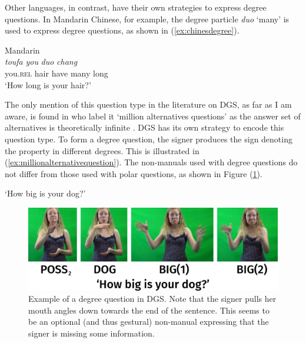 \noindent Other languages, in contrast, have their own strategies to express degree questions. In Mandarin Chinese, for example, the degree particle \textit{duo} `many' is used to express degree questions, as shown in (\ref{ex:chinesdegree}).


\begin{exe}
\ex Mandarin \\  {\textit{toufa}} {\textit{you}} {\textit{duo}} {\textit{chang}} \\
{you.\textsc{rel}} {hair} {have} {many} {long} \\
\trans `How long is your hair?' \label{ex:chinesdegree}
\end{exe} 

\noindent The only mention of this question type in the literature on DGS, as far as I am aware, is found in \citet[335]{happ2014vork} who label it `million alternatives questions' as the answer set of alternatives is theoretically infinite \citep{fox2006universal}. DGS has its own strategy to encode this question type. To form a degree question, the signer produces the sign denoting the property in different degrees. This is illustrated in (\ref{ex:millionalternativequestion}). The non-manuals used with degree questions do not differ from those used with polar questions, as shown in Figure (\ref{millionalternativequestions}).

\begin{exe}
\ex {}
\glt `How big is your dog?' \label{ex:millionalternativequestion}
\end{exe}


\begin{figure}[bt]
\centering
	\includegraphics[width=1.0\textwidth]{millionalternativequestions.jpg}
	\caption{Example of a degree question in DGS. Note that the signer pulls her mouth angles down towards the end of the sentence. This seems to be an optional (and thus gestural) non-manual expressing that the signer is missing some information.  }
	\label{millionalternativequestions}
\end{figure}

